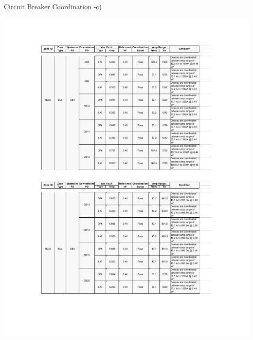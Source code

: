 \begin{table}[]
	\caption{Circuit Breaker Coordination -c)}
	\label{ch04_elecaudit_protectioncoordination03c}
	\includegraphics[width=\textwidth]{tables/ch04_elecaudit_protectioncoordination03c.pdf}	
\end{table}

